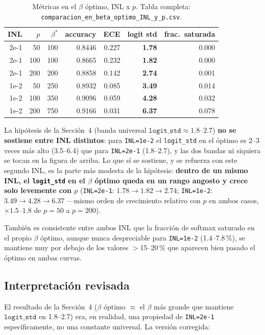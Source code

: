 \documentclass[11pt]{article}
\begin{document}
\begin{table}[htb]
\centering
\begin{tabular}{@{}rrrrrrr@{}}
\toprule
INL & $p$ & $\beta^*$ & accuracy & ECE & \textbf{logit std} & frac.\ saturada \\
\midrule
2e-1 & 50  & 100 & 0.8446 & 0.227 & \textbf{1.78} & 0.000 \\
2e-1 & 100 & 100 & 0.8665 & 0.232 & \textbf{1.82} & 0.000 \\
2e-1 & 200 & 200 & 0.8858 & 0.142 & \textbf{2.74} & 0.001 \\
1e-2 & 50  & 250 & 0.8932 & 0.085 & \textbf{3.49} & 0.014 \\
1e-2 & 100 & 350 & 0.9096 & 0.059 & \textbf{4.28} & 0.032 \\
1e-2 & 200 & 750 & 0.9166 & 0.031 & \textbf{6.37} & 0.078 \\
\bottomrule
\end{tabular}
\caption{Métricas en el $\beta$ óptimo, INL x $p$. Tabla completa:
\texttt{comparacion\_en\_beta\_optimo\_INL\_y\_p.csv}.}
\end{table}

La hipótesis de la Sección~4 (banda universal
$\texttt{logit\_std}\approx1.8$--$2.7$) \textbf{no se sostiene entre INL
distintos}: para \texttt{INL=1e-2} el \texttt{logit\_std} en el óptimo es
2--3 veces más alto (3.5--6.4) que para \texttt{INL=2e-1} (1.8--2.7), y las
dos bandas ni siquiera se tocan en la figura de arriba. Lo que sí se
sostiene, y se refuerza con este segundo INL, es la parte más modesta de
la hipótesis: \textbf{dentro de un mismo INL, el \texttt{logit\_std} en el
$\beta$ óptimo queda en un rango angosto y crece solo levemente con $p$}
(\texttt{INL=2e-1}: $1.78\to1.82\to2.74$; \texttt{INL=1e-2}:
$3.49\to4.28\to6.37$ —mismo orden de crecimiento relativo con $p$ en ambos
casos, $\times1.5$--$1.8$ de $p{=}50$ a $p{=}200$).

También es consistente entre ambos INL que la fracción de softmax saturado
en el propio $\beta$ óptimo, aunque nunca despreciable para
\texttt{INL=1e-2} (1.4--7.8\,\%), se mantiene muy por debajo de los
valores $>$15--20\,\% que aparecen bien pasado el óptimo en ambas curvas.

\subsection{Interpretación revisada}

El resultado de la Sección~4 ($\beta$ óptimo $\approx$ el $\beta$ más
grande que mantiene $\texttt{logit\_std}$ en 1.8--2.7) era, en realidad,
una propiedad de \texttt{INL=2e-1} específicamente, no una constante
universal. La versión corregida:
\end{document}
